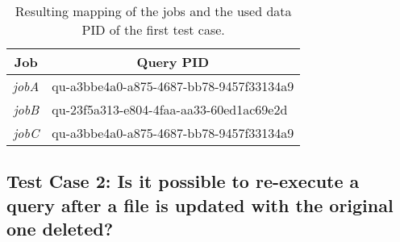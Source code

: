 \documentclass[draft,final]{vutinfth} %
\begin{document}
\begin{table}[]
	\caption{Resulting mapping of the jobs and the used data PID of the first test case.}
	\centering
	\begin{tabular}{|r|l|}
		\hline \multicolumn{1}{|c|}{\textbf{Job}}  &  \multicolumn{1}{c|}{\textbf{Query PID}} \\ \hline
		\textit{jobA} & qu-a3bbe4a0-a875-4687-bb78-9457f33134a9  \\ 
		\textit{jobB} & qu-23f5a313-e804-4faa-aa33-60ed1ac69e2d \\
		\textit{jobC} & qu-a3bbe4a0-a875-4687-bb78-9457f33134a9  \\ \hline
	\end{tabular}
	\label{Tab:eva_datachanges4}
\end{table}
\newpage
\subsection{Test Case 2: Is it possible to re-execute a query after a file is updated with the original one deleted?}
\end{document}
